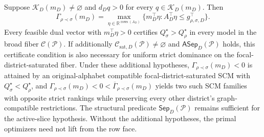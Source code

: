 Suppose \(\mathcal K_D(m_D)\ne\varnothing\) and \(d_Dq>0\) for every \(q\in\mathcal K_D(m_D)\). Then
\[
\Gamma_{\rho\prec\sigma}(m_D)=
\max_{\eta\in\mathbb R^{\operatorname{rows}(A_D)}}
\{m_D^\top\eta:A_D^\top\eta\le g_{\rho,\sigma,D}^\top\}.
\]
Every feasible dual vector with \(m_D^\top\eta>0\) certifies \(Q_\sigma^\star>Q_\rho^\star\) in every model in the broad fiber \(\mathcal C(\mathcal P)\). If additionally \(\mathcal C_{\mathrm{sat},D}(\mathcal P)\ne\varnothing\) and \(\mathsf{ASep}_D(\mathcal P)\) holds, this certificate condition is also necessary for uniform strict dominance on the focal-district-saturated fiber. Under these additional hypotheses, \(\Gamma_{\rho\prec\sigma}(m_D)<0\) is attained by an original-alphabet compatible focal-district-saturated SCM with \(Q_\sigma^\star<Q_\rho^\star\), and \(\Gamma_{\rho\prec\sigma}(m_D)<0<\overline\Gamma_{\rho\prec\sigma}(m_D)\) yields two such SCM families with opposite strict rankings while preserving every other district's graph-compatible restrictions. The structural predicate \(\mathsf{Sep}_D(\mathcal P)\) remains sufficient for the active-slice hypothesis. Without the additional hypotheses, the primal optimizers need not lift from the row face.